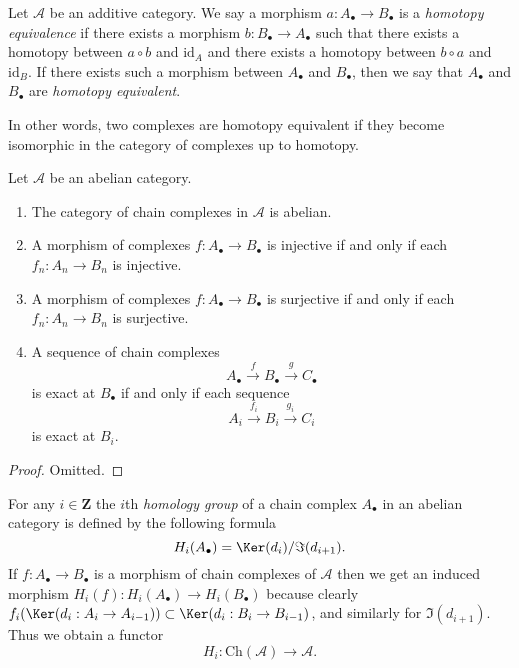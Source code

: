 \begin{definition}
\label{definition-homotopy-equivalent}
Let $\mathcal{A}$ be an additive category.
We say a morphism $a : A_\bullet \to B_\bullet$
is a {\it homotopy equivalence} if there exists
a morphism $b : B_\bullet \to A_\bullet$
such that there exists a homotopy between
$a \circ b$ and $\text{id}_A$
and there exists a homotopy between $b \circ a$ and $\text{id}_B$.
If there exists such a morphism between $A_\bullet$ and $B_\bullet$, then
we say that $A_\bullet$ and $B_\bullet$ are {\it homotopy equivalent}.
\end{definition}

\noindent
In other words, two complexes are homotopy equivalent if they become
isomorphic in the category of complexes up to homotopy.

\begin{lemma}
\label{lemma-cat-chain-abelian}
Let $\mathcal{A}$ be an abelian category.
\begin{enumerate}
\item The category of chain complexes in $\mathcal{A}$ is
abelian.
\item A morphism of complexes
$f : A_\bullet \to B_\bullet$ is injective
if and only if each $f_n : A_n \to B_n$ is injective.
\item A morphism of complexes
$f : A_\bullet \to B_\bullet$ is surjective
if and only if each $f_n : A_n \to B_n$ is surjective.
\item A sequence of chain complexes
$$
A_\bullet \xrightarrow{f} B_\bullet \xrightarrow{g} C_\bullet
$$
is exact at $B_\bullet$ if and only if each sequence
$$
A_i \xrightarrow{f_i} B_i \xrightarrow{g_i} C_i
$$
is exact at $B_i$.
\end{enumerate}
\end{lemma}

\begin{proof}
Omitted.
\end{proof}

\noindent
For any $i \in \mathbf{Z}$ the $i$th {\it homology group}
of a chain complex $A_\bullet$ in an abelian category is defined by
the following formula
$$
H_i(A_\bullet) = \Ker(d_i)/\Im(d_{i + 1}).
$$
If $f : A_\bullet \to B_\bullet$ is a morphism of chain
complexes of $\mathcal{A}$ then we get an induced
morphism $H_i(f) : H_i(A_\bullet) \to H_i(B_\bullet)$
because clearly
$f_i(\Ker(d_i : A_i \to A_{i - 1})) \subset
\Ker(d_i : B_i \to B_{i - 1})$, and similarly
for $\Im(d_{i + 1})$.
Thus we obtain a functor
$$
H_i : \text{Ch}(\mathcal{A}) \longrightarrow \mathcal{A}.
$$

